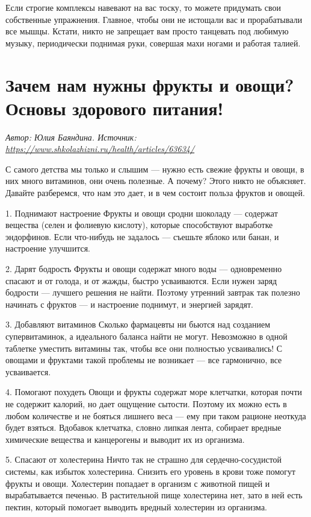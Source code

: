 Если строгие комплексы навевают на вас тоску, то можете придумать свои собственные упражнения. Главное, чтобы они не истощали вас и прорабатывали все мышцы. Кстати, никто не запрещает вам просто танцевать под любимую музыку, периодически поднимая руки, совершая махи ногами и работая талией.

\newpage
\section{Зачем нам нужны фрукты и овощи? Основы здорового питания!}
\textit{Автор: Юлия Баяндина.
    Источник: \url{https://www.shkolazhizni.ru/health/articles/63634/}}

С самого детства мы только и слышим — нужно есть свежие фрукты и овощи, в них много витаминов, они очень полезные. А почему? Этого никто не объясняет. Давайте разберемся, что нам это дает, и в чем состоит польза фруктов и овощей.

1. Поднимают настроение
Фрукты и овощи сродни шоколаду — содержат вещества (селен и фолиевую кислоту), которые способствуют выработке эндорфинов. Если что-нибудь не задалось — съешьте яблоко или банан, и настроение улучшится.

2. Дарят бодрость Фрукты и овощи содержат много воды — одновременно спасают и от голода, и от жажды, быстро усваиваются. Если нужен заряд бодрости — лучшего решения не найти. Поэтому утренний завтрак так полезно начинать с фруктов — и настроение поднимут, и энергией зарядят.

3. Добавляют витаминов Сколько фармацевты ни бьются над созданием супервитаминок, а идеального баланса найти не могут. Невозможно в одной таблетке уместить витамины так, чтобы все они полностью усваивались! С овощами и фруктами такой проблемы не возникает — все гармонично, все усваивается.

4. Помогают похудеть Овощи и фрукты содержат море клетчатки, которая почти не содержит калорий, но дает ощущение сытости. Поэтому их можно есть в любом количестве и не бояться лишнего веса — ему при таком рационе неоткуда будет взяться. Вдобавок клетчатка, словно липкая лента, собирает вредные химические вещества и канцерогены и выводит их из организма.

5. Спасают от холестерина Ничто так не страшно для сердечно-сосудистой системы, как избыток холестерина. Снизить его уровень в крови тоже помогут фрукты и овощи. Холестерин попадает в организм с животной пищей и вырабатывается печенью. В растительной пище холестерина нет, зато в ней есть пектин, который помогает выводить вредный холестерин из организма.

